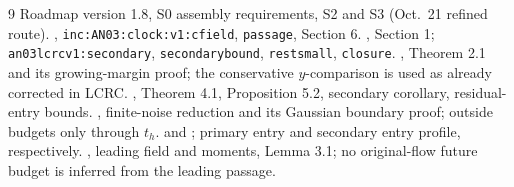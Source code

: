 \documentclass[11pt]{article}
\theoremstyle{remark}\newtheorem{remark}[proposition]{Remark}
\begin{document}
\begin{thebibliography}{9}\small
{} Roadmap version 1.8, S0 assembly requirements,
S2 and S3 (Oct.\ 21 refined route).
 ,
\texttt{inc:AN03:clock:v1:cfield}, \texttt{passage}, Section 6.
 ,
Section 1; \texttt{an03lcrcv1:secondary},
\texttt{secondarybound}, \texttt{restsmall}, \texttt{closure}.
 ,
Theorem 2.1 and its growing-margin proof; the conservative
$y$-comparison is used as already corrected in LCRC.
 ,
Theorem 4.1, Proposition 5.2, secondary corollary,
residual-entry bounds.
 ,
finite-noise reduction and its Gaussian boundary proof;
outside budgets only through $t_h$.
  and
;
primary entry and secondary entry profile, respectively.
 ,
leading field and moments, Lemma 3.1; no original-flow
future budget is inferred from the leading passage.
\end{thebibliography}
\end{document}
